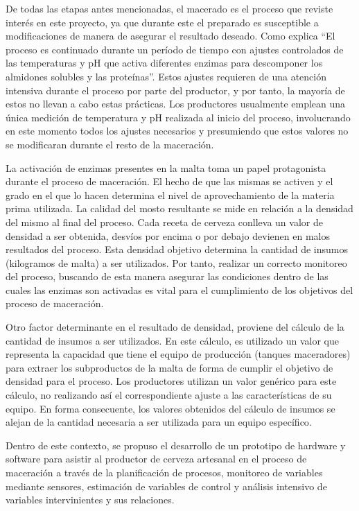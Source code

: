 	\par
	De todas las etapas antes mencionadas, el macerado es el proceso que reviste interés en este proyecto, ya que durante este el preparado es susceptible a modificaciones de manera de asegurar el resultado deseado. Como explica \cite{Papazian} “El proceso es continuado durante un período de tiempo con ajustes controlados de las temperaturas y pH que activa diferentes enzimas para descomponer los almidones solubles y las proteínas”. Estos ajustes requieren de una atención intensiva durante el proceso por parte del productor, y por tanto, la mayoría de estos no llevan a cabo estas prácticas. Los productores usualmente emplean una única medición de temperatura y pH realizada al inicio del proceso, involucrando en este momento todos los ajustes necesarios y presumiendo que estos valores no se modificaran durante el resto de la maceración.
	\par
	La activación de enzimas presentes en la malta toma un papel protagonista durante el proceso de maceración. El hecho de que las mismas se activen y el grado en el que lo hacen determina el nivel de aprovechamiento de la materia prima utilizada. La calidad del mosto resultante se mide en relación a la densidad del mismo al final del proceso. Cada receta de cerveza conlleva un valor de densidad a ser obtenida, desvíos por encima o por debajo devienen en malos resultados del proceso. Esta densidad objetivo determina la cantidad de insumos (kilogramos de malta) a ser utilizados. Por tanto, realizar un correcto monitoreo del proceso, buscando de esta manera asegurar las condiciones dentro de las cuales las enzimas son activadas es vital para el cumplimiento de los objetivos del proceso de maceración.
	\par
	Otro factor determinante en el resultado de densidad, proviene del cálculo de la cantidad de insumos a ser utilizados. En este cálculo, es utilizado un valor que representa la capacidad que tiene el equipo de producción (tanques maceradores) para extraer los subproductos de la malta de forma de cumplir el objetivo de densidad para el proceso. Los productores utilizan un valor genérico para este cálculo, no realizando así el correspondiente ajuste a las características de su equipo. En forma consecuente, los valores obtenidos del cálculo de insumos se alejan de la cantidad necesaria a ser utilizada para un equipo específico.
	\par
    Dentro de este contexto, se propuso el desarrollo de un prototipo de hardware y software para asistir al productor de cerveza artesanal en el proceso de maceración a través de la planificación de procesos, monitoreo de variables mediante sensores, estimación de variables de control y análisis intensivo de variables intervinientes y sus relaciones.
